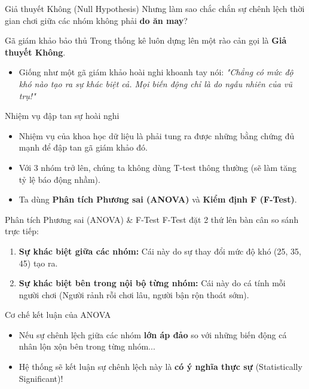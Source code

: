 \documentclass[aspectratio=169]{beamer}
\begin{document}
\begin{frame}{Giả thuyết Không (Null Hypothesis)}
    Nhưng làm sao chắc chắn sự chênh lệch thời gian chơi giữa các nhóm không phải \textbf{do ăn may}?
    \begin{block}{Gã giám khảo bảo thủ}
        Trong thống kê luôn dựng lên một rào cản gọi là \textbf{Giả thuyết Không}.
        \begin{itemize}
            \item Giống như một gã giám khảo hoài nghi khoanh tay nói: \textit{"Chẳng có mức độ khó nào tạo ra sự khác biệt cả. Mọi biến động chỉ là do ngẫu nhiên của vũ trụ!"}
        \end{itemize}
    \end{block}
\end{frame}

\begin{frame}{Nhiệm vụ đập tan sự hoài nghi}
    \begin{itemize}
        \item Nhiệm vụ của khoa học dữ liệu là phải tung ra được những bằng chứng đủ mạnh để đập tan gã giám khảo đó.
        \item Với 3 nhóm trở lên, chúng ta không dùng T-test thông thường (sẽ làm tăng tỷ lệ báo động nhầm).
        \item Ta dùng \textbf{Phân tích Phương sai (ANOVA)} và \textbf{Kiểm định F (F-Test)}.
    \end{itemize}
\end{frame}

\begin{frame}{Phân tích Phương sai (ANOVA) \& F-Test}
    F-Test đặt 2 thứ lên bàn cân so sánh trực tiếp:
    \begin{enumerate}
        \item \textbf{Sự khác biệt giữa các nhóm:} Cái này do sự thay đổi mức độ khó (25, 35, 45) tạo ra.
        \item \textbf{Sự khác biệt bên trong nội bộ từng nhóm:} Cái này do cá tính mỗi người chơi (Người rảnh rỗi chơi lâu, người bận rộn thoát sớm).
    \end{enumerate}
\end{frame}

\begin{frame}{Cơ chế kết luận của ANOVA}
    \begin{itemize}
        \item Nếu sự chênh lệch giữa các nhóm \textbf{lớn áp đảo} so với những biến động cá nhân lộn xộn bên trong từng nhóm...
        \item Hệ thống sẽ kết luận sự chênh lệch này là \textbf{có ý nghĩa thực sự} (Statistically Significant)!
    \end{itemize}
\end{frame}
\end{document}
